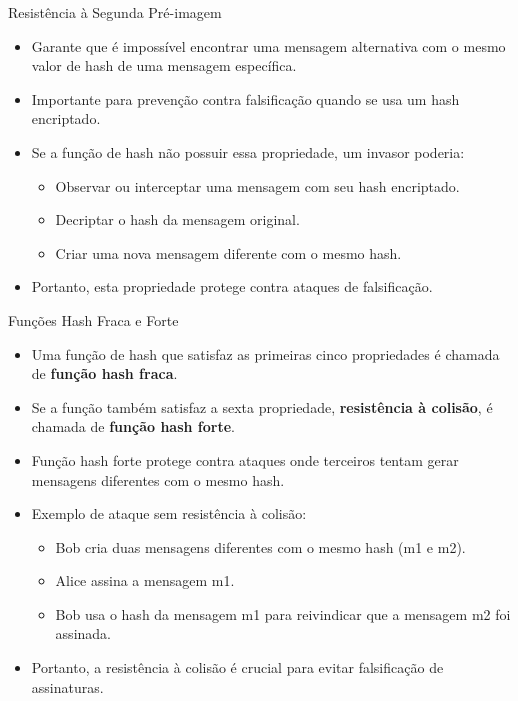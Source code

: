 \begin{frame}{Resistência à Segunda Pré-imagem}
    \begin{itemize}
        \item Garante que é impossível encontrar uma mensagem alternativa com o mesmo valor de hash de uma mensagem específica.
        \item Importante para prevenção contra falsificação quando se usa um hash encriptado.
        \item Se a função de hash não possuir essa propriedade, um invasor poderia:
              \begin{itemize}
                  \item Observar ou interceptar uma mensagem com seu hash encriptado.
                  \item Decriptar o hash da mensagem original.
                  \item Criar uma nova mensagem diferente com o mesmo hash.
              \end{itemize}
        \item Portanto, esta propriedade protege contra ataques de falsificação.
    \end{itemize}
\end{frame}

\begin{frame}{Funções Hash Fraca e Forte}
    \begin{itemize}
        \item Uma função de hash que satisfaz as primeiras cinco propriedades é chamada de \textbf{função hash fraca}.
        \item Se a função também satisfaz a sexta propriedade, \textbf{resistência à colisão}, é chamada de \textbf{função hash forte}.
        \item Função hash forte protege contra ataques onde terceiros tentam gerar mensagens diferentes com o mesmo hash.
        \item Exemplo de ataque sem resistência à colisão:
              \begin{itemize}
                  \item Bob cria duas mensagens diferentes com o mesmo hash (m1 e m2).
                  \item Alice assina a mensagem m1.
                  \item Bob usa o hash da mensagem m1 para reivindicar que a mensagem m2 foi assinada.
              \end{itemize}
        \item Portanto, a resistência à colisão é crucial para evitar falsificação de assinaturas.
    \end{itemize}
\end{frame}

